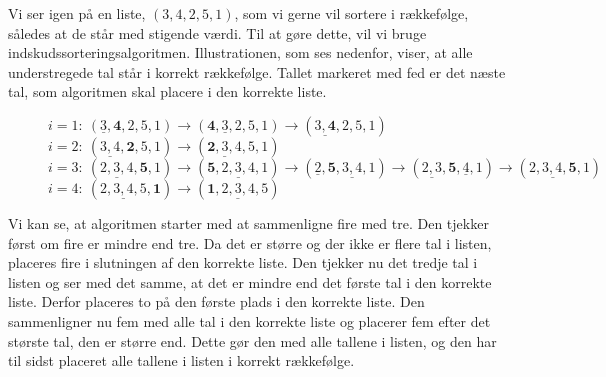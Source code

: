 \begin{exmp}
Vi ser igen på en liste, $(3,4,2,5,1)$, som vi gerne vil sortere i rækkefølge, således at de står med stigende værdi. Til at gøre dette, vil vi bruge indskudssorteringsalgoritmen. Illustrationen, som ses nedenfor, viser, at alle understregede tal står i korrekt rækkefølge. Tallet markeret med fed er det næste tal, som algoritmen skal placere i den korrekte liste.

\begin{figure}[H]
\label{fig:indskud}
	\begin{flushleft}
	$i=1: \ (\underline{3},\textbf{4},2,5,1) \rightarrow (\textbf{4}, \underline{3},2,5,1)\rightarrow (\underline{3,\textbf{4}},2,5,1)$ \\
	$i=2: \ (\underline{3,4},\textbf{2},5,1) \rightarrow (\underline{\textbf{2},3,4},5,1) $\\
	$i=3: \ (\underline{2,3,4},\textbf{5},1) \rightarrow (\textbf{5},\underline{2,3,4},1) \rightarrow (\underline{2}, \textbf{5},\underline{3,4},1) \rightarrow (\underline{2,3}, \textbf{5}, \underline{4},1) \rightarrow (\underline{2,3,4,\textbf{5}},1) $ \\
	$i=4: \ (\underline{2,3,4,5},\textbf{1}) \rightarrow (\underline{\textbf{1},2,3,4,5}) $\\
 	\end{flushleft}
\end{figure}

Vi kan se, at algoritmen starter med at sammenligne fire med tre. Den tjekker først om fire er mindre end tre. Da det er større og der ikke er flere tal i listen, placeres fire i slutningen af den korrekte liste. Den tjekker nu det tredje tal i listen og ser med det samme, at det er mindre end det første tal i den korrekte liste. Derfor placeres to på den første plads i den korrekte liste. Den sammenligner nu fem med alle tal i den korrekte liste og placerer fem efter det største tal, den er større end. Dette gør den med alle tallene i listen, og den har til sidst placeret alle tallene i listen i korrekt rækkefølge.


\end{exmp}